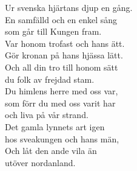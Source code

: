 \documentclass[a6paper,10pt]{article}
\begin{document}
\setlength{\oddsidemargin}{-0.47in}
\begin{center}
\end{center}
\begin{lyrics}
Ur svenska hjärtans djup en gång.\\
En samfälld och en enkel sång\\
som går till Kungen fram.\\
Var honom trofast och hans ätt.\\
Gör kronan på hans hjässa lätt.\\
Och all din tro till honom sätt\\
du folk av frejdad stam.\\
\newline
Du himlens herre med oss var,\\
som förr du med oss varit har\\
och liva på vår strand.\\
Det gamla lynnets art igen\\
hos sveakungen och hans män,\\
Och låt den ande vila än\\
utöver nordanland.\\
\end{lyrics}
\end{document}
